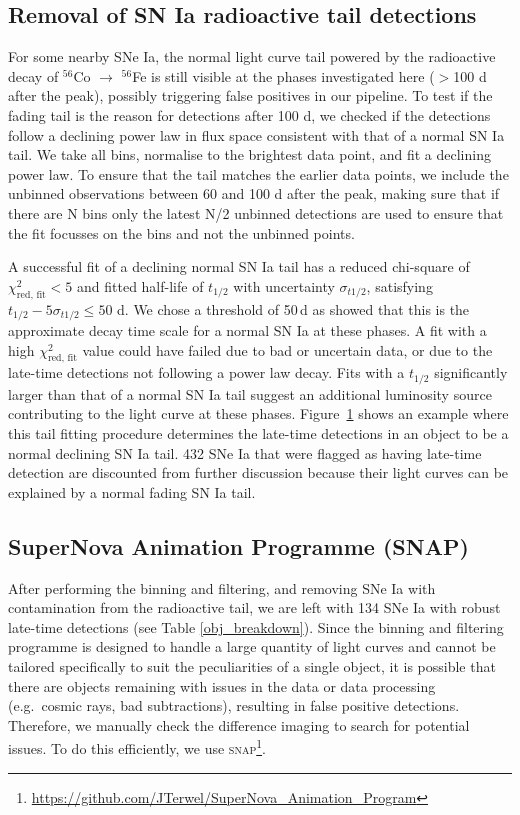 \documentclass[a4paper,oneside,12pt, class=Latex/Classes/PhDthesisPSnPDF, crop=false]{standalone}
\begin{document}
\begin{figure}
 \label{bin_showcase}
\end{figure}

\subsection{Removal of SN Ia radioactive tail detections}
\label{tail_removal} 
For some nearby SNe Ia, the normal light curve tail powered by the radioactive decay of $^{56}$Co $\rightarrow$ $^{56}$Fe is still visible at the phases investigated here ($>$100 d after the peak), possibly triggering false positives in our pipeline. To test if the fading tail is the reason for detections after 100 d, we checked if the detections follow a declining power law in flux space consistent with that of a normal SN Ia tail. We take all bins, normalise to the brightest data point, and fit a declining power law. To ensure that the tail matches the earlier data points, we include the unbinned observations between 60 and 100 d after the peak, making sure that if there are N bins only the latest N/2 unbinned detections are used to ensure that the fit focusses on the bins and not the unbinned points.

A successful fit of a declining normal SN Ia tail has a reduced chi-square of $\chi^2_\text{red, fit} < 5$ and fitted half-life of $t_{1/2}$ with uncertainty $\sigma_{t1/2}$, satisfying $t_{1/2} - 5\sigma_{t1/2} \leq 50$ d. We chose a threshold of 50\,d as \citealt{Georgios_11fe} showed that this is the approximate decay time scale for a normal SN Ia at these phases. A fit with a high $\chi^2_\text{red, fit}$ value could have failed due to bad or uncertain data, or due to the late-time detections not following a power law decay. Fits with a $t_{1/2}$ significantly larger than that of a normal SN Ia tail suggest an additional luminosity source contributing to the light curve at these phases. Figure~\ref{bin_showcase} shows an example where this tail fitting procedure determines the late-time detections in an object to be a normal declining SN Ia tail. 432 SNe Ia that were flagged as having late-time detection are discounted from further discussion because their light curves can be explained by a normal fading SN Ia tail. 


\subsection{SuperNova Animation Programme (SNAP)}
\label{snap}
 After performing the binning and filtering, and removing SNe Ia with contamination from the radioactive tail, we are left with 134 SNe Ia with robust late-time detections (see Table \ref{obj_breakdown}). Since the binning and filtering programme is designed to handle a large quantity of light curves and cannot be tailored specifically to suit the peculiarities of a single object, it is possible that there are objects remaining with issues in the data or data processing (e.g.~cosmic rays, bad subtractions), resulting in false positive detections. Therefore, we manually check the difference imaging to search for potential issues. To do this efficiently, we use \textsc{snap}\footnote{\url{https://github.com/JTerwel/SuperNova_Animation_Program}}.
\end{document}
